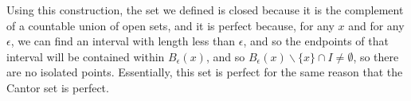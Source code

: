 \documentclass{article}
\begin{document}
\begin{enumerate}
\begin{enumerate}
        \smallskip

        Using this construction, the set we defined is closed because it is the complement of a countable union of open sets, and it is perfect because, for any $x$ and for any $\epsilon$, we can find an interval with length less than $\epsilon$, and so the endpoints of that interval will be contained within $B_\epsilon(x)$, and so $B_\epsilon(x) \backslash \{x\} \cap I \neq \emptyset$, so there are no isolated points. Essentially, this set is perfect for the same reason that the Cantor set is perfect.  
        
    \end{enumerate}
\end{enumerate}
\end{document}
